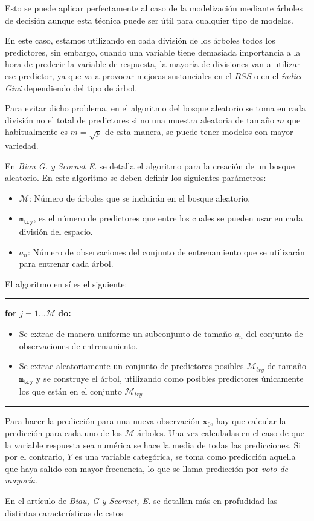 \noindent Esto se puede aplicar perfectamente al caso de la modelización mediante árboles de decisión aunque esta técnica puede ser útil para cualquier tipo de modelos. 

\noindent En este caso, estamos utilizando en cada división de los árboles todos los predictores, sin embargo, cuando una variable tiene demasiada importancia a la hora de predecir la variable de respuesta, la mayoría de divisiones van a utilizar ese predictor, ya que va a provocar mejoras sustanciales en el $RSS$ o en el \textit{índice Gini} dependiendo del tipo de árbol. 

\noindent Para evitar dicho problema, en el algoritmo del bosque aleatorio se toma en cada división no el total de predictores si no una muestra aleatoria de tamaño $m$ que habitualmente es $m=\sqrt{p}$ de esta manera, se puede tener modelos con mayor variedad. 

\noindent En \textit{Biau G. y Scornet E.}\cite{Biau 2016} se detalla el algoritmo para la creación de un bosque aleatorio. 
En este algoritmo se deben definir los siguientes parámetros:
\begin{itemize}
\item $\mathcal{M}$: Número de árboles que se incluirán en el bosque aleatorio. 
\item $\mathtt{m}_{\mathtt{try}}$, es el número de predictores que entre los cuales se pueden usar en cada división del espacio. 
\item $a_n$: Número de observaciones del conjunto de entrenamiento que se utilizarán para entrenar cada árbol. 
\end{itemize}

\noindent El algoritmo en sí es el siguiente: 
\hrule
\textbf{for } $j=1\ldots \mathcal{M} $ \textbf{do:}
\begin{itemize}
\item Se extrae de manera uniforme un subconjunto de tamaño $a_n$ del conjunto de observaciones de entrenamiento. 
\item Se extrae aleatoriamente un conjunto de predictores posibles $\mathcal{M}_{try}$ de tamaño $\mathtt{m}_{\mathtt{try}}$ y se construye el árbol, utilizando como posibles  predictores únicamente los que están en el conjunto $\mathcal{M}_{try}$
\end{itemize}
\hrule

\noindent Para hacer la predicción para una nueva observación $\textbf{x}_0$, hay que calcular la predicción para cada uno de los $\mathcal{M}$ árboles. Una vez calculadas en el caso de que la variable respuesta sea numérica se hace la media de todas las predicciones. Si por el contrario, $Y$ es una variable categórica, se toma como predicción aquella que haya salido con mayor frecuencia, lo que se llama predicción por \textit{voto de mayoría}.

\noindent En el artículo de \textit{Biau, G y Scornet, E.} \cite{Biau 2016} se detallan más en profudidad las distintas características de estos 

 